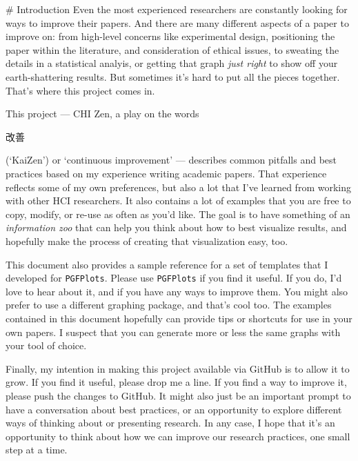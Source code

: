 

\begin{markdown}

# Introduction
Even the most experienced researchers are constantly looking for ways to improve their papers. And there are many different aspects of a paper to improve on: from high-level concerns like experimental design, positioning the paper within the literature, and consideration of ethical issues, to sweating the details in a statistical analyis, or getting that graph \emph{just right} to show off your earth-shattering results. But sometimes it's hard to put all the pieces together. That's where this project comes in. 
\end{markdown}

This project --- CHI Zen, a play on the words \begin{CJK}{UTF8}{min}改善\end{CJK} (`KaiZen') or `continuous improvement' --- describes common pitfalls and best practices based on my experience writing academic papers. That experience reflects some of my own preferences, but also a lot that I've learned from working with other HCI researchers. It also contains a lot of examples that you are free to copy, modify, or re-use as often as you'd like. The goal is to have something of an \emph{information zoo} \citep{heer2010tour} that can help you think about how to best visualize results, and hopefully make the process of creating that visualization easy, too. 

\begin{markdown}
This document also provides a sample reference for a set of templates that I developed for \texttt{PGFPlots}. Please use \texttt{PGFPlots} if you find it useful. If you do, I'd love to hear about it, and if you have any ways to improve them. You might also prefer to use a different graphing package, and that's cool too. The examples contained in this document hopefully can provide tips or shortcuts for use in your own papers. I suspect that you can generate more or less the same graphs with your tool of choice. 

Finally, my intention in making this project available via GitHub is to allow it to grow. If you find it useful, please drop me a line. If you find a way to improve it, please push the changes to GitHub. It might also just be an important prompt to have a conversation about best practices, or an opportunity to explore different ways of thinking about or presenting research. In any case, I hope that it's an opportunity to think about how we can improve our research practices, one small step at a time. 

\end{markdown}